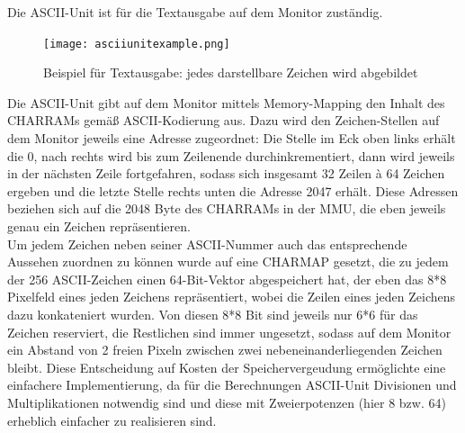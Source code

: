 
\label{ch:asciiunit}
Die ASCII-Unit ist f\"ur die Textausgabe auf dem Monitor zust\"andig.

\begin{figure}[!htbp]
	\centering
	\texttt{[image: asciiunitexample.png]}
	\caption{Beispiel f\"ur Textausgabe: jedes darstellbare Zeichen wird abgebildet}
	\label{fig:exampletext}
\end{figure}


Die ASCII-Unit gibt auf dem Monitor mittels Memory-Mapping den Inhalt des CHARRAMs gem{\"a}{\ss} ASCII-Kodierung aus. Dazu wird den Zeichen-Stellen auf dem Monitor jeweils eine Adresse zugeordnet: Die Stelle im Eck oben links erh\"alt die 0, nach rechts wird bis zum Zeilenende durchinkrementiert, dann wird jeweils in der n\"achsten Zeile fortgefahren, sodass sich insgesamt 32 Zeilen \`a 64 Zeichen ergeben und die letzte Stelle rechts unten die Adresse 2047 erh\"alt. Diese Adressen beziehen sich auf die 2048 Byte des CHARRAMs in der MMU, die eben jeweils genau ein Zeichen repr\"asentieren.\\
Um jedem Zeichen neben seiner ASCII-Nummer auch das entsprechende Aussehen zuordnen zu k\"onnen wurde auf eine CHARMAP gesetzt, die zu jedem der 256 ASCII-Zeichen einen 64-Bit-Vektor abgespeichert hat, der eben das 8*8 Pixelfeld eines jeden Zeichens repr\"asentiert, wobei die Zeilen eines jeden Zeichens dazu konkateniert wurden. Von diesen 8*8 Bit sind jeweils nur 6*6 f\"ur das Zeichen reserviert, die Restlichen sind immer ungesetzt, sodass auf dem Monitor ein Abstand von 2 freien Pixeln zwischen zwei nebeneinanderliegenden Zeichen bleibt. Diese Entscheidung auf Kosten der Speichervergeudung erm\"oglichte eine einfachere Implementierung, da f\"ur die Berechnungen ASCII-Unit Divisionen und Multiplikationen notwendig sind und diese mit Zweierpotenzen (hier 8 bzw. 64) erheblich einfacher zu realisieren sind.

